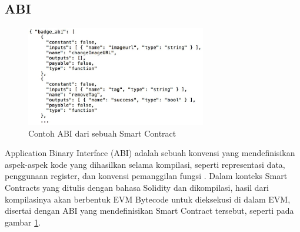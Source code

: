 \subsection{ABI}
\label{subsec:abi}

\begin{figure}[ht]
  \centering
  \includegraphics[width=0.7\textwidth]{resources/chapter-2/smart-contract-abi.jpg}
  \caption{Contoh ABI dari sebuah Smart Contract \parencite{third2017linked}}
  \label{image:abi-example}
\end{figure}

Application Binary Interface (ABI) adalah sebuah konvensi yang mendefinisikan aspek-aspek kode yang dihasilkan selama kompilasi, seperti representasi data, penggunaan register, dan konvensi pemanggilan fungsi \parencite{sciencedirect2024}. Dalam konteks Smart Contracts yang ditulis dengan bahasa Solidity dan dikompilasi, hasil dari kompilasinya akan berbentuk EVM Bytecode untuk dieksekusi di dalam EVM, disertai dengan ABI yang mendefinisikan Smart Contract tersebut, seperti pada gambar \ref{image:abi-example}.
